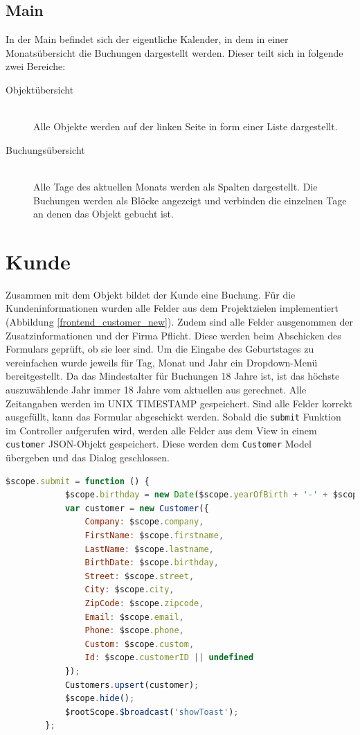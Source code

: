 \subsection{Main}
In der Main befindet sich der eigentliche Kalender, in dem in einer Monatsübersicht die Buchungen dargestellt werden. 
Dieser teilt sich in folgende zwei Bereiche:
\begin{description}
\item[Objektübersicht]\hfill \\
Alle Objekte werden auf der linken Seite in form einer Liste dargestellt.
\item[Buchungsübersicht]\hfill \\ 
Alle Tage des aktuellen Monats werden als Spalten dargestellt. Die Buchungen werden als Blöcke angezeigt und verbinden die einzelnen Tage an denen das Objekt gebucht ist.  
\end{description}

\section{Kunde}
Zusammen mit dem Objekt bildet der Kunde eine Buchung. Für die Kundeninformationen wurden alle Felder aus dem Projektzielen implementiert (Abbildung \ref{frontend_customer_new}). Zudem sind alle Felder ausgenommen der Zusatzinformationen und der Firma Pflicht. Diese werden beim Abschicken des Formulars geprüft, ob sie leer sind. Um die Eingabe des Geburtstages zu vereinfachen wurde jeweils für Tag, Monat und Jahr ein Dropdown-Menü bereitgestellt. Da das Mindestalter für Buchungen 18 Jahre ist, ist das höchste auszuwählende Jahr immer 18 Jahre vom aktuellen aus gerechnet. Alle Zeitangaben werden im UNIX TIMESTAMP gespeichert. Sind alle Felder korrekt ausgefüllt, kann das Formular abgeschickt werden. Sobald die \texttt{submit} Funktion im Controller aufgerufen wird, werden alle Felder aus dem View in einem \texttt{customer} JSON-Objekt gespeichert. Diese werden dem \texttt{Customer} Model übergeben und das Dialog geschlossen. 

\begin{lstlisting}[language=JavaScript, label=code_exampleRegistrationRequest, caption=Beispielhafte Antwort auf eine Registrierungsanfrage]
		$scope.submit = function () {
            $scope.birthday = new Date($scope.yearOfBirth + '-' + $scope.monthOfBirth + '-' + $scope.dayOfBirth).getTime();
            var customer = new Customer({
                Company: $scope.company,
                FirstName: $scope.firstname,
                LastName: $scope.lastname,
                BirthDate: $scope.birthday,
                Street: $scope.street,
                City: $scope.city,
                ZipCode: $scope.zipcode,
                Email: $scope.email,
                Phone: $scope.phone,
                Custom: $scope.custom,
                Id: $scope.customerID || undefined
            });
            Customers.upsert(customer);
            $scope.hide();
            $rootScope.$broadcast('showToast');
        };
\end{lstlisting}

